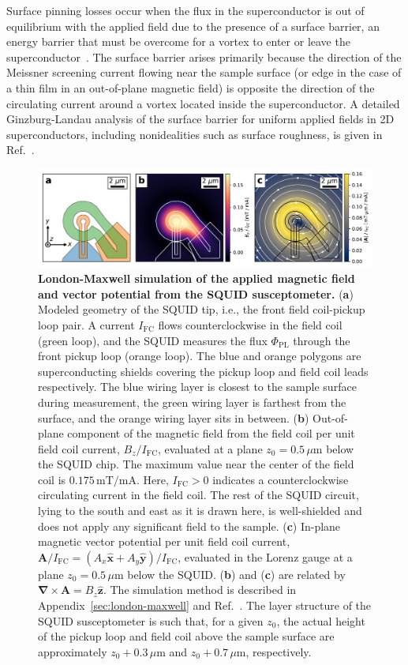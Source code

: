 \documentclass[%
 reprint,
 superscriptaddress,
 amsmath,
 amssymb,
 amsfonts,
 aps,
 prb,
]{revtex4-2}
\newcommand{\FC}{\mathrm{FC}}
\newcommand{\PL}{\mathrm{PL}}
\newcommand{\mA}{\mathrm{mA}}
\newcommand{\mT}{\mathrm{mT}}
\newcommand{\um}{\mu\mathrm{m}}
\renewcommand{\vec}{\mathbf}
\begin{document}
Surface pinning losses occur when the flux in the superconductor is out of equilibrium with the applied field due to the presence of a surface barrier, an energy barrier that must be overcome for a vortex to enter or leave the superconductor~\cite{Bean1964-hv, Hernandez2002-nx}. The surface barrier arises primarily because the direction of the Meissner screening current flowing near the sample surface (or edge in the case of a thin film in an out-of-plane magnetic field) is opposite the direction of the circulating current around a vortex located inside the superconductor. A detailed Ginzburg-Landau analysis of the surface barrier for uniform applied fields in 2D superconductors, including nonidealities such as surface roughness, is given in Ref.~\cite{Benfenati2020-mg}.

\begin{figure}
    \centering
    \includegraphics[width=\textwidth]{figures/squid-outline.pdf}
    \caption{{\bf London-Maxwell simulation of the applied magnetic field and vector potential from the SQUID susceptometer.} ({\bf a}) Modeled geometry of the SQUID tip, i.e., the front field coil-pickup loop pair. A current $I_\FC$ flows counterclockwise in the field coil (green loop), and the SQUID measures the flux $\Phi_\PL$ through the front pickup loop (orange loop). The blue and orange polygons are superconducting shields covering the pickup loop and field coil leads respectively. The blue wiring layer is closest to the sample surface during measurement, the green wiring layer is farthest from the surface, and the orange wiring layer sits in between. ({\bf b}) Out-of-plane component of the magnetic field from the field coil per unit field coil current, $B_z/I_\FC$, evaluated at a plane $z_0=0.5\,\um$ below the SQUID chip. The maximum value near the center of the field coil is $0.175\,\mT/\mA$. Here, $I_\FC>0$ indicates a counterclockwise circulating current in the field coil. The rest of the SQUID circuit, lying to the south and east as it is drawn here, is well-shielded and does not apply any significant field to the sample. ({\bf c}) In-plane magnetic vector potential per unit field coil current, $\vec{A}/I_\FC=(A_x\hat{\mathbf{x}} + A_y\hat{\mathbf{y}})/I_\FC$, evaluated in the Lorenz gauge at a plane $z_0=0.5\,\um$ below the SQUID. ({\bf b}) and ({\bf c}) are related by $\vec{\nabla}\times\vec{A}=B_z\hat{\mathbf{z}}$. The simulation method is described in Appendix~\ref{sec:london-maxwell} and Ref.~\cite{Bishop-Van_Horn2022-sy}. The layer structure of the SQUID susceptometer is such that, for a given $z_0$, the actual height of the pickup loop and field coil above the sample surface are approximately $z_0+0.3\,\um$ and $z_0+0.7\,\um$, respectively.}
    \label{fig:squid}
\end{figure}
\end{document}
